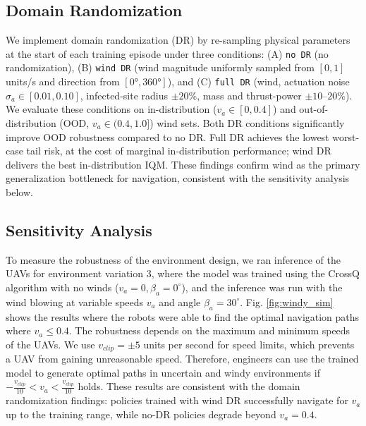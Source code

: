 \documentclass{article}
\begin{document}
\subsection{Domain Randomization}
\label{sec:dr}
We implement domain randomization (DR) by re-sampling physical parameters at the start of each training episode under three conditions: (A) \texttt{no DR} (no randomization), (B) \texttt{wind DR} (wind magnitude uniformly sampled from $[0, 1]$\,units/s and direction from $[0°, 360°]$), and (C) \texttt{full DR} (wind, actuation noise $\sigma_a \in [0.01, 0.10]$, infected-site radius $\pm 20\%$, mass and thrust-power $\pm 10$--$20\%$). We evaluate these conditions on in-distribution ($v_a \in [0, 0.4]$) and out-of-distribution (OOD, $v_a \in (0.4, 1.0]$) wind sets. Both DR conditions significantly improve OOD robustness compared to no DR. Full DR achieves the lowest worst-case tail risk, at the cost of marginal in-distribution performance; wind DR delivers the best in-distribution IQM. These findings confirm wind as the primary generalization bottleneck for navigation, consistent with the sensitivity analysis below.

\subsection{Sensitivity Analysis}
To measure the robustness of the environment design, we ran inference of the UAVs for environment variation 3, where the model was trained using the CrossQ algorithm with no winds ($v_a = 0, \beta_a = 0^{\circ}$), and the inference was run with the wind blowing at variable speeds $v_a$ and angle $\beta_a=30^{\circ}$. Fig. \ref{fig:windy_sim} shows the results where the robots were able to find the optimal navigation paths where $v_a \leq 0.4$. The robustness depends on the maximum and minimum speeds of the UAVs. We use $v_{clip} = \pm 5$ units per second for speed limits, which prevents a UAV from gaining unreasonable speed. Therefore, engineers can use the trained model to generate optimal paths in uncertain and windy environments if $-\frac{v_{clip}}{10} < v_a < \frac{v_{clip}}{10}$ holds. These results are consistent with the domain randomization findings: policies trained with wind DR successfully navigate for $v_a$ up to the training range, while no-DR policies degrade beyond $v_a = 0.4$.
\end{document}
